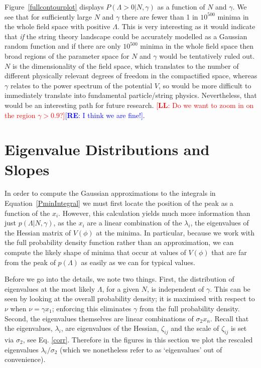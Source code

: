 \documentclass[12pt]{article}
\newcommand{\re}[1]{\textcolor{blue}{[{\bf RE}: #1]}}
\newcommand{\lfl}[1]{\textcolor{red}{[{\bf LL}: #1]}}
\begin{document}
Figure~\ref{fullcontourplot} displays  $P(\Lambda >0 |N,\gamma)$ as a function of $N$ and $\gamma$. We see that for sufficiently large $N$ and $\gamma$ there are fewer than 1 in $10^{500}$ minima in the whole field space with positive $\Lambda$. This is very interesting as it would indicate that \emph{if} the string theory landscape could be accurately modelled as a Gaussian random function and if there are only $10^{500}$ minima in the whole field space then broad regions of the parameter space for $N$ and $\gamma$ would be tentatively ruled out. $N$ is the dimensionality of the field space, which translates to the number of different physically relevant degrees of freedom in the compactified space, whereas $\gamma$ relates to the power spectrum of the potential $V$, so would be more difficult to immediately translate into fundamental particle/string physics. Nevertheless, that would be an interesting path for future research. \lfl{Do we want to zoom in on the region $\gamma > 0.9$?}\re{I think we are fine!}.


\section{Eigenvalue Distributions and Slopes} 

In order to compute the Gaussian  approximations to the integrals in Equation~\ref{PminIntegral} we must first locate the position of the peak as a function of the $x_i$. However, this calculation yields much more information than just $p(\Lambda  |N,\gamma)$, as the $x_i$ are a linear combination of the $\lambda_i$, the eigenvalues of the Hessian matrix of $V(\phi)$ at the minima. In particular, because we work with the full probability density function rather than an approximation, we can compute the likely shape of minima that occur at values of $V(\phi)$ that  are  far from the peak of $p(\Lambda)$ as easily as we can for typical values.

Before we go into the details, we note two things. First, the distribution of eigenvalues at the most likely $\Lambda$, for a given $N$, is independent of $\gamma$. This can be seen by looking at the overall probability density; it is maximised with respect to $\nu$ when $\nu = \gamma x_1$; enforcing this eliminates $\gamma$ from the full  probability density. Second, the eigenvalues themselves are linear combinations of $\sigma_2x_n$. Recall that the eigenvalues, $\lambda_i$, are eigenvalues of the Hessian, $\zeta_{ij}$ and the scale of $\zeta_{ij}$ is set via $\sigma_2$, see Eq. \eqref{corr}. Therefore in the figures in this section we plot the rescaled eigenvalues $\lambda_i/\sigma_2$ (which we nonetheless refer to as `eigenvalues' out of convenience).
\end{document}
